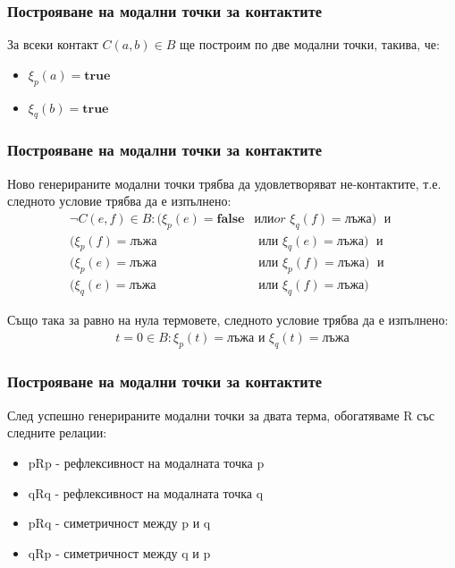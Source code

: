 \documentclass{beamer}
\newcommand{\vBool}{\xi}
\begin{document}
\begin{frame}\frametitle{Построяване на модални точки за контактите}
	За всеки контакт $C(a, b) \in B$ ще построим по две модални точки, такива, че:
		\begin{itemize}
			\item $\vBool_{p}(a) = \textbf{true}$
			\item $\vBool_{q}(b) = \textbf{true}$
		\end{itemize}
\end{frame}

\begin{frame}\frametitle{Построяване на модални точки за контактите}
	Ново генерираните модални точки трябва да удовлетворяват не-контактите, т.е. следното условие трябва да е изпълнено:
		\begin{align*}
			 \neg C(e, f) \in B: (\vBool_{p}(e) = \textbf{false} & \textit{илиor } \vBool_{q}(f) = \textbf{лъжа}) \; \textit{ и } \\
				(\vBool_{p}(f) = \textbf{лъжа} & \textit{ или } \vBool_{q}(e) = \textbf{лъжа}) \; \textit{ и } \\
				(\vBool_{p}(e) = \textbf{лъжа} & \textit{ или } \vBool_{p}(f) = \textbf{лъжа}) \; \textit{ и } \\
				(\vBool_{q}(e) = \textbf{лъжа} & \textit{ или } \vBool_{q}(f) = \textbf{лъжа})
		\end{align*}

	Също така за равно на нула термовете, следното условие трябва да е изпълнено:
	\begin{align*}
		t = 0 \in B: \vBool_{p}(t) = \textit{лъжа} \text{ и }  \vBool_{q}(t) = \textit{лъжа}
	\end{align*}
\end{frame}

\begin{frame}\frametitle{Построяване на модални точки за контактите}
	След успешно генерираните модални точки за двата терма, обогатяваме R със следните релации:
	\begin{itemize}
		\item pRp - рефлексивност на модалната точка p
		\item qRq - рефлексивност на модалната точка q
		\item pRq - симетричност между p и q
		\item qRp - симетричност между q и p
	\end{itemize}
\end{frame}
\end{document}
